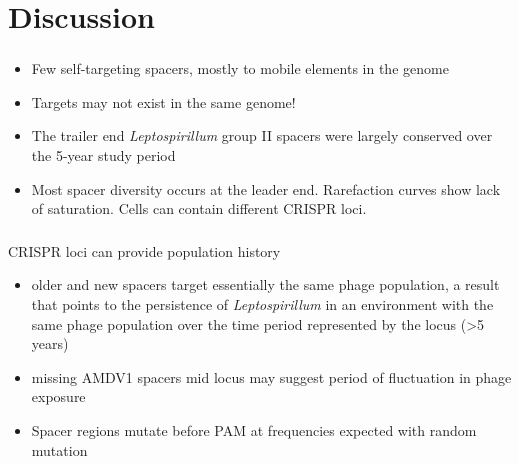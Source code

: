 \documentclass[10pt]{beamer}
\begin{document}
\section{Discussion}

\begin{frame}[fragile]
	\frametitle{}
    
	\begin{itemize}
		\item Few self-targeting spacers, mostly to mobile elements in the genome
        \item Targets may not exist in the same genome!
        \item The trailer end \emph{Leptospirillum} group II spacers were largely conserved over the 5-year study period
        \item Most spacer diversity occurs at the leader end. Rarefaction curves show lack of saturation. Cells can contain different CRISPR loci.
	\end{itemize}

\end{frame}

\begin{frame}[fragile]
	\frametitle{}
    CRISPR loci can provide population history 
    \begin{itemize}
		\item older and new spacers target essentially the same phage population, a result that points to the persistence of \emph{Leptospirillum} in an environment with the same phage population over the time period represented by the locus (>5 years)
        \item missing AMDV1 spacers mid locus may suggest period of fluctuation in phage exposure
        \item Spacer regions mutate before PAM at frequencies expected with random mutation
	\end{itemize}
 

\end{frame}

\end{document}
